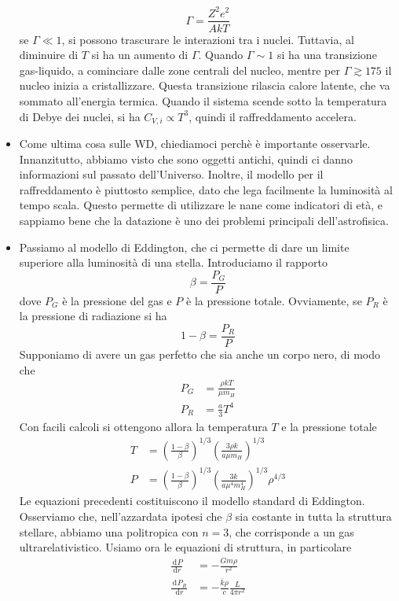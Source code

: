 \documentclass[a4paper,11pt]{article}
\renewcommand{\d}{\mathrm{d}} %
\newcommand{\der}[3][]{\frac{\d ^{#1}#2}{\d {#3}^{#1}}} %
\renewcommand{\d}{\,\mathrm{d}}
\theoremstyle{theorem}
\theoremstyle{definition}
\begin{document}
\begin{itemize}
		\[\Gamma=\frac{Z^2e^2}{AkT}\]
		se $\Gamma\ll 1$, si possono trascurare le interazioni tra i nuclei. Tuttavia, al diminuire di $T$ si ha un aumento di $\Gamma$. Quando $\Gamma\sim 1$ si ha una transizione gas-liquido, a cominciare dalle zone centrali del nucleo, mentre per $\Gamma\gtrsim 175$ il nucleo inizia a cristallizzare. Questa transizione rilascia calore latente, che va sommato all'energia termica. Quando il sistema scende sotto la temperatura di Debye dei nuclei, si ha $C_{V,i}\propto T^3$, quindi il raffreddamento accelera.
		\item Come ultima cosa sulle WD, chiediamoci perchè è importante osservarle. Innanzitutto, abbiamo visto che sono oggetti antichi, quindi ci danno informazioni sul passato dell'Universo. Inoltre, il modello per il raffreddamento è piuttosto semplice, dato che lega facilmente la luminosità al tempo scala. Questo permette di utilizzare le nane come indicatori di età, e sappiamo bene che la datazione è uno dei problemi principali dell'astrofisica.
		\item Passiamo al modello di Eddington, che ci permette di dare un limite superiore alla luminosità di una stella. Introduciamo il rapporto
		\[\beta=\frac{P_G}{P}\]
		dove $P_G$ è la pressione del gas e $P$ è la pressione totale. Ovviamente, se $P_R$ è la pressione di radiazione si ha
		\[1-\beta=\frac{P_R}{P}\]
		Supponiamo di avere un gas perfetto che sia anche un corpo nero, di modo che
		\begin{align*}
			P_G&=\frac{\rho kT}{\mu m_H}\\P_R&=\frac{a}{3}T^4
		\end{align*}
		Con facili calcoli si ottengono allora la temperatura $T$ e la pressione totale
		\begin{align*}T&=\left(\frac{1-\beta}{\beta}\right)^{1/3}\left(\frac{3\rho k}{a\mu m_H}\right)^{1/3}\\P&=\left(\frac{1-\beta}{\beta}\right)^{1/3}\left(\frac{3k}{a\mu^4m_H^4}\right)^{1/3}\rho^{4/3}\end{align*}
		Le equazioni precedenti costituiscono il modello standard di Eddington. Osserviamo che, nell'azzardata ipotesi che $\beta$ sia costante in tutta la struttura stellare, abbiamo una politropica con $n=3$, che corrisponde a un gas ultrarelativistico. Usiamo ora le equazioni di struttura, in particolare
		\begin{align*}
			\der{P}{r}&=-\frac{Gm\rho}{r^2}\\
			\der{P_R}{r}&=-\frac{\bar{k}\rho}{c}\frac{L}{4\pi r^2}
		\end{align*}

\end{itemize}
\end{document}
